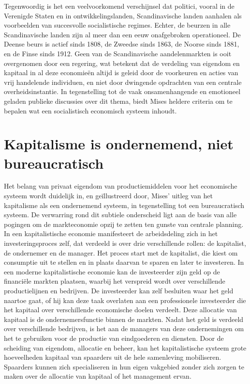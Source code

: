 Tegenwoordig is het een veelvoorkomend verschijnsel dat politici, vooral in de Verenigde Staten en in ontwikkelingslanden, Scandinavische landen aanhalen als voorbeelden van succesvolle socialistische regimes. Echter, de beurzen in alle Scandinavische landen zijn al meer dan een eeuw onafgebroken operationeel. De Deense beurs is actief sinds 1808, de Zweedse sinds 1863, de Noorse sinds 1881, en de Finse sinds 1912.\autocite{134} Geen van de Scandinavische aandelenmarkten is ooit overgenomen door een regering, wat betekent dat de verdeling van eigendom en kapitaal in al deze economieën altijd is geleid door de voorkeuren en acties van vrij handelende individuen, en niet door dwingende opdrachten van een centrale overheidsinstantie. In tegenstelling tot de vaak onsamenhangende en emotioneel geladen publieke discussies over dit thema, biedt Mises heldere criteria om te bepalen wat een socialistisch economisch systeem inhoudt.

\hypertarget{kapitalisme-is-ondernemend-niet-bureaucratisch}{%
\section{Kapitalisme is ondernemend, niet bureaucratisch}\label{kapitalisme-is-ondernemend-niet-bureaucratisch}}

Het belang van privaat eigendom van productiemiddelen voor het economische systeem wordt duidelijk in, en geïllustreerd door, Mises' uitleg van het kapitalisme als een ondernemend systeem, in tegenstelling tot een bureaucratisch systeem. De verwarring rond dit subtiele onderscheid ligt aan de basis van alle pogingen om de markteconomie opzij te zetten ten gunste van centrale planning. In een kapitalistische economie manifesteert de arbeidsdeling zich in het investeringsproces zelf, dat verdeeld is over drie verschillende rollen: de kapitalist, de ondernemer en de manager. Het proces start met de kapitalist, die kiest om consumptie uit te stellen en in plaats daarvan te sparen en later te investeren. In een moderne kapitalistische economie kan de investeerder zijn geld op de financiële markten plaatsen, waarbij het verspreid wordt over verschillende productielijnen en bedrijven. De investeerder kan zelf besluiten waar het geld naartoe gaat, of hij kan deze taak overlaten aan een professionele investeerder die het kapitaal over verschillende economische doelen verdeelt. Deze allocatie van kapitaal is de ondernemersfunctie binnen de markten. Nadat het geld is verdeeld over verschillende bedrijven, is het aan de managers van deze ondernemingen om het te gebruiken voor de productie van eindgoederen en diensten. Door de scheiding van eigendom, allocatie en beheer, kan het kapitalistische systeem grote hoeveelheden kapitaal van spaarders uit de hele samenleving mobiliseren. Spaarders kunnen zich specialiseren in hun eigen vakgebied zonder zich zorgen te maken over de allocatie van kapitaal of het management ervan.

